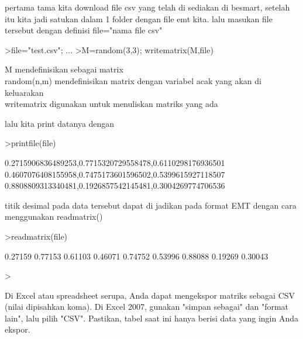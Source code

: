 \documentclass[a4paper,10pt]{article}
\begin{document}
\begin{eulernotebook}
\begin{eulercomment}
\begin{eulercomment}
\begin{eulercomment}
\begin{eulercomment}
\begin{eulercomment}
\begin{eulercomment}
\begin{eulercomment}
\begin{eulercomment}
\begin{eulercomment}
\begin{eulercomment}
\begin{eulercomment}
pertama tama kita download file csv yang telah di sediakan di besmart,
setelah itu kita jadi satukan dalam 1 folder dengan file emt kita.
lalu masukan file tersebut dengan definisi file="nama file csv"
\end{eulercomment}
\begin{eulerprompt}
>file="test.csv";  ...
>M=random(3,3); writematrix(M,file)
\end{eulerprompt}
\begin{eulercomment}
M mendefinisikan sebagai matrix\\
random(n,m) mendefinisikan matrix dengan variabel acak yang akan di
keluarakan\\
writematrix digunakan untuk menuliskan matriks yang ada

lalu kita print datanya dengan
\end{eulercomment}
\begin{eulerprompt}
>printfile(file)
\end{eulerprompt}
\begin{euleroutput}
  0.2715906836489253,0.7715320729558478,0.6110298176936501
  0.4607076408155958,0.7475173601596502,0.5399615927118507
  0.8808809313340481,0.1926857542145481,0.3004269774706536
  
\end{euleroutput}
\begin{eulercomment}
titik desimal pada data tersebut dapat di jadikan pada format EMT
dengan cara menggunakan readmatrix()
\end{eulercomment}
\begin{eulerprompt}
>readmatrix(file)
\end{eulerprompt}
\begin{euleroutput}
    0.27159   0.77153   0.61103 
    0.46071   0.74752   0.53996 
    0.88088   0.19269   0.30043 
\end{euleroutput}
\begin{eulerprompt}
> 
\end{eulerprompt}
\begin{eulercomment}
Di Excel atau spreadsheet serupa, Anda dapat mengekspor matriks
sebagai CSV (nilai dipisahkan koma). Di Excel 2007, gunakan "simpan
sebagai" dan "format lain", lalu pilih "CSV". Pastikan, tabel saat ini
hanya berisi data yang ingin Anda ekspor.


\end{eulercomment}
\end{eulercomment}
\end{eulercomment}
\end{eulercomment}
\end{eulercomment}
\end{eulercomment}
\end{eulercomment}
\end{eulercomment}
\end{eulercomment}
\end{eulercomment}
\end{eulercomment}
\end{eulernotebook}
\end{document}

